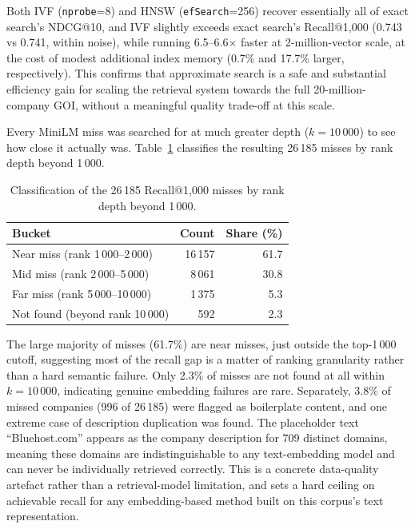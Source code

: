 \documentclass[a4paper,oneside,bibliography=totoc]{scrbook}
\begin{document}
Both IVF (\texttt{nprobe}=8) and HNSW (\texttt{efSearch}=256) recover essentially all of exact search's NDCG@10, and IVF slightly exceeds exact search's Recall@1{,}000 (0.743 vs 0.741, within noise), while running 6.5--6.6$\times$ faster at 2-million-vector scale, at the cost of modest additional index memory (0.7\% and 17.7\% larger, respectively). This confirms that approximate search is a safe and substantial efficiency gain for scaling the retrieval system towards the full 20-million-company GOI, without a meaningful quality trade-off at this scale.

\label{sec:error_analysis_result}

Every MiniLM miss was searched for at much greater depth ($k=10\,000$) to see how close it actually was. Table~\ref{tab:error_analysis} classifies the resulting 26\,185 misses by rank depth beyond 1\,000.

\begin{table}[ht]
\centering
\caption{Classification of the 26\,185 Recall@1{,}000 misses by rank depth beyond 1\,000.}
\label{tab:error_analysis}
\begin{tabular}{lrr}
\toprule
\textbf{Bucket} & \textbf{Count} & \textbf{Share (\%)} \\
\midrule
Near miss (rank 1\,000--2\,000)   & 16\,157 & 61.7 \\
Mid miss (rank 2\,000--5\,000)    &  8\,061 & 30.8 \\
Far miss (rank 5\,000--10\,000)   &  1\,375 &  5.3 \\
Not found (beyond rank 10\,000)   &    592 &  2.3 \\
\bottomrule
\end{tabular}
\end{table}

The large majority of misses (61.7\%) are near misses, just outside the top-1\,000 cutoff, suggesting most of the recall gap is a matter of ranking granularity rather than a hard semantic failure. Only 2.3\% of misses are not found at all within $k=10\,000$, indicating genuine embedding failures are rare. Separately, 3.8\% of missed companies (996 of 26\,185) were flagged as boilerplate content, and one extreme case of description duplication was found. The placeholder text ``Bluehost.com'' appears as the company description for 709 distinct domains, meaning these domains are indistinguishable to any text-embedding model and can never be individually retrieved correctly. This is a concrete data-quality artefact rather than a retrieval-model limitation, and sets a hard ceiling on achievable recall for any embedding-based method built on this corpus's text representation.
\end{document}
